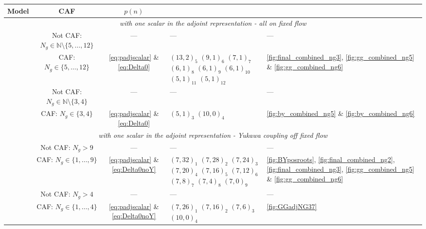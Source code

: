 \begin{table}[ht]
\centering
\renewcommand{\arraystretch}{1.4}
\renewcommand{\tabularxcolumn}[1]{m{#1}} 

\begin{tabularx}{\textwidth}{@{}ccc >{\centering\arraybackslash}X >{\centering\arraybackslash}m{1.8cm} @{}}
\toprule
\multicolumn{1}{c}{\textbf{Model}} & \multicolumn{1}{c}{\textbf{CAF}} & \multicolumn{1}{c}{\textbf{$p(n)$}} & \multicolumn{1}{c}{\textbf{$(N,p)_{N_g}$}} & \multicolumn{1}{c}{\textbf{Figures}} \\
\midrule
\multicolumn{5}{c}{\textit{with one scalar in the adjoint representation - all on fixed flow}} \\
\midrule
\rowcolor{myDarkerBlue} & Not CAF: $N_g \in \mathbb{N} \setminus \{5,\dots,12\}$ &--- &--- &--- \\
\rowcolor{myDarkerBlue} \multirow{-2}{*}{GG} & CAF: $N_g\in\{5,\dots,12\}$ &\eqref{eq:padjscalar} \& \eqref{eq:Delta0} & $(13,2)_5$ $(9,1)_6$ $(7,1)_7$ $(6,1)_8$ $(6,1)_9$ $(6,1)_{10}$ $(5,1)_{11}$ $(5,1)_{12}$ & \ref{fig:final_combined_ng3}, \ref{fig:gg_combined_ng5} \& \ref{fig:gg_combined_ng6}\\

\rowcolor{myLightBlue} &Not CAF: $N_g \in \mathbb{N} \setminus \{3,4\}$ &--- &--- &--- \\
\rowcolor{myLightBlue} \multirow{-2}{*}{BY} & CAF: $N_g\in\{3,4\}$ & \eqref{eq:padjscalar} \& \eqref{eq:Delta0} &$(5,1)_3$ $(10,0)_4$ &\ref{fig:by_combined_ng5} \& \ref{fig:by_combined_ng6} \\


\midrule
\multicolumn{5}{c}{\textit{with one scalar in the adjoint representation - Yukawa coupling off fixed flow}} \\
\midrule
\rowcolor{myDarkerBlue} & Not CAF: $N_g > 9$ & --- & --- & --- \\
\rowcolor{myDarkerBlue} \multirow{-2}{*}{GG} & CAF: $N_g \in \{1,\dots,9\}$ & \eqref{eq:padjscalar} \& \eqref{eq:Delta0noY} & $(7,32)_1$ $(7,28)_2$ $(7,24)_3$ $(7,20)_4$ $(7,16)_5$ $(7,12)_6$ $(7,8)_7$ $(7,4)_8$ $(7,0)_9$ & \ref{fig:BYposroots}, \ref{fig:final_combined_ng2}, \ref{fig:final_combined_ng3}, \ref{fig:gg_combined_ng5} \& \ref{fig:gg_combined_ng6}\\

\rowcolor{myLightBlue} & Not CAF: $N_g > 4$ & --- & --- & --- \\
\rowcolor{myLightBlue} \multirow{-2}{*}{BY} & CAF: $N_g \in \{1,\dots,4\}$ & \eqref{eq:padjscalar} \& \eqref{eq:Delta0noY} & $(7,26)_1$ $(7,16)_2$ $(7,6)_3$ $(10,0)_4$ &  \ref{fig:GGadjNG37} \\



\end{tabularx}
\end{table}
